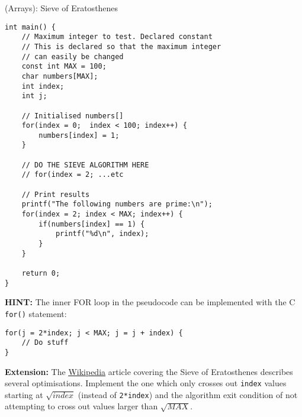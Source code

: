 \documentclass{lab}
\begin{document}
\begin{task}{(Arrays): Sieve of Eratosthenes}{}
\begin{lstlisting}[style=Ctable]
int main() {
	// Maximum integer to test. Declared constant
	// This is declared so that the maximum integer
	// can easily be changed
	const int MAX = 100;
	char numbers[MAX];
	int index;
	int j;

	// Initialised numbers[]
	for(index = 0;	index < 100; index++) {
		numbers[index] = 1;
	}

	// DO THE SIEVE ALGORITHM HERE
	// for(index = 2; ...etc
	
	// Print results
	printf("The following numbers are prime:\n");
	for(index = 2; index < MAX; index++) {
		if(numbers[index] == 1) {
			printf("%d\n", index);
		}
	}
	
	return 0;
}
\end{lstlisting}
\textbf{HINT:} The inner FOR loop in the pseudocode can be implemented with the C \texttt{for()} statement:
\begin{lstlisting}[style=Ctable]
for(j = 2*index; j < MAX; j = j + index) {
	// Do stuff
}
\end{lstlisting}
\textbf{Extension:} The \underline{\href{https://en.wikipedia.org/wiki/Sieve_of_Eratosthenes}{Wikipedia}} article covering the Sieve of Eratosthenes describes several optimisations. Implement the one which only crosses out \texttt{index} values starting at $\sqrt{index}$ (instead of \texttt{2*index}) and the algorithm exit condition of not attempting to cross out values larger than $\sqrt{MAX}$.
\end{task}
\end{document}

